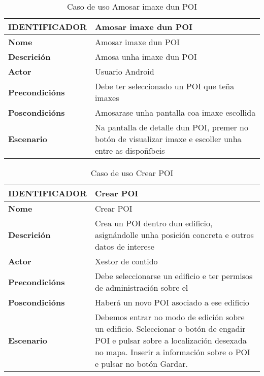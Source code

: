 \begin{table}[tbp]
	\begin{tabular}{|l|p{10cm}|}
		\hline 
		\textbf{IDENTIFICADOR}	& \textbf{Amosar imaxe dun POI} \\ 
		\hline 
		\textbf{Nome} & Amosar imaxe dun POI \\ 
		\hline 
		\textbf{Descrición} & Amosa unha imaxe dun POI \\ 
		\hline 
		\textbf{Actor} & Usuario Android \\ 
		\hline 
		\textbf{Precondicións} & Debe ter seleccionado un POI que teña imaxes \\ 
		\hline 
		\textbf{Poscondicións} & Amosarase unha pantalla coa imaxe escollida \\ 
		\hline 
		\textbf{Escenario} & Na pantalla de detalle dun POI, premer no botón de visualizar imaxe e escoller unha entre as dispoñíbeis \\ 
		\hline 
	\end{tabular}
	\caption{Caso de uso Amosar imaxe dun POI}
	\label{tab:cuAmosarImaxePOI}
\end{table}

\begin{table}[tbp]
	\begin{tabular}{|l|p{10cm}|}
		\hline 
		\textbf{IDENTIFICADOR}	& \textbf{Crear POI} \\ 
		\hline 
		\textbf{Nome} & Crear POI \\ 
		\hline 
		\textbf{Descrición} & Crea un POI dentro dun edificio, asignándolle unha posición concreta e outros datos de interese \\ 
		\hline 
		\textbf{Actor} & Xestor de contido \\ 
		\hline 
		\textbf{Precondicións} & Debe seleccionarse un edificio e ter permisos de administración sobre el \\ 
		\hline 
		\textbf{Poscondicións} & Haberá un novo POI asociado a ese edificio \\ 
		\hline 
		\textbf{Escenario} & Debemos entrar no modo de edición sobre un edificio. Seleccionar o botón de engadir POI e pulsar sobre a localización desexada no mapa. Inserir a información sobre o POI e pulsar no botón Gardar. \\ 
		\hline 
	\end{tabular}
	\caption{Caso de uso Crear POI}
	\label{tab:cuCrearPOI}
\end{table}

